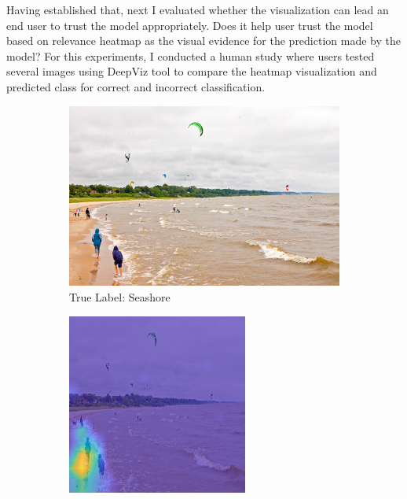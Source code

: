 Having established that, next I evaluated whether the visualization can lead an end user to trust the model appropriately. Does it help user trust the model based on relevance heatmap as the visual evidence for the prediction made by the model? For this experiments, I conducted a human study where users tested several images using DeepViz tool to compare the heatmap visualization and predicted class for correct and incorrect classification.

\begin{figure}
     \centering
     \caption{User Testing Example of Correct and Incorrect Classification}
     \begin{subfigure}[b]{0.30\textwidth}
         \centering
         \includegraphics[width=\textwidth]{images/seashore.jpeg}
         \caption{True Label: Seashore}
         \label{fig:layer-5}
     \end{subfigure}
     \hspace{1em}%
     \begin{subfigure}[b]{0.30\textwidth}
         \centering
         \includegraphics[width=\textwidth]{images/seashore-hm.png}

\end{subfigure}
\end{figure}
